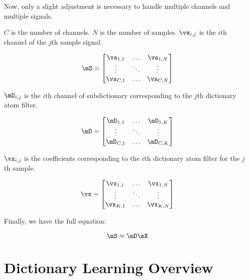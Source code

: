 \documentclass{article}
\begin{document}
Now, only a slight adjustment is necessary to handle multiple channels and multiple signals.

$C$ is the number of channels.
$N$ is the number of samples.
$\vs_{i,j}$ is the $i$th channel of the $j$th sample signal.

\begin{equation}
\begin{aligned}
\mS = \begin{bmatrix} \vs_{1,1} & \hdots & \vs_{1,N} \\
                      \vdots & \ddots & \vdots \\
                      \vs_{C,1} & \hdots & \vs_{C,N}
      \end{bmatrix}
\end{aligned}
\end{equation}

$\mD_{i,j}$ is the $i$th channel of subdictionary corresponding to the $j$th dictionary atom filter.

\begin{equation}
\begin{aligned}
\mD = \begin{bmatrix} \mD_{1,1} & \hdots & \mD_{1,K} \\
                      \vdots & \ddots & \vdots \\
                      \mD_{C,1} & \hdots & \mD_{C,K}
      \end{bmatrix}
\end{aligned}
\end{equation}

$\vx_{i,j}$ is the coefficients corresponding to the $i$th dictionary atom filter for the $j$th sample.

\begin{equation}
\vx = \begin{bmatrix} \vx_{1,1} & \hdots & \vx_{1,N} \\
                      \vdots & \ddots & \vdots \\ 
                      \vx_{K,1} & \hdots & \vx_{K,N} 
      \end{bmatrix}
\end{equation}

Finally, we have the full equation:

\begin{equation}
\mS \approx \mD\mX
\end{equation}

\section{Dictionary Learning Overview}
\end{document}
